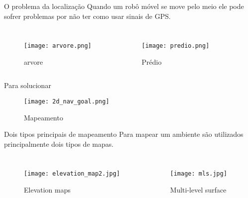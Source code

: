 \begin{frame}[t]{O problema da localização} 
    \transdissolve[duration=0.5]
    Quando um robô móvel se move pelo meio ele pode sofrer problemas por não ter como usar sinais de GPS.
        \begin{columns}[t]
            \begin{figure}
                \texttt{[image: arvore.png]}
                \caption{arvore\cite{arvore}}
            \end{figure}
            \begin{figure}
                \texttt{[image: predio.png]}
                \caption{Prédio\cite{predio}}
            \end{figure}

        \end{columns}
\end{frame}

\begin{frame}[t]{Para solucionar} 
    \transdissolve[duration=0.5]
    \begin{center}
        \begin{figure}
            \texttt{[image: 2d\_nav\_goal.png]}
            \caption{Mapeamento\cite{Turtlebot}}
        \end{figure}
    \end{center}

\end{frame}

\begin{frame}[t]{Dois tipos principais de mapeamento} 
    \transdissolve[duration=0.5]
    Para mapear um ambiente são utilizados principalmente dois tipos de mapas.
    \begin{columns}[t]
        \begin{figure}
            \texttt{[image: elevation\_map2.jpg]}
            \caption{Elevation maps\cite{article}}
        \end{figure}
        \begin{figure}
            \texttt{[image: mls.jpg]}
            \caption{Multi-level surface\cite{article}}
        \end{figure}
    \end{columns}

\end{frame}

